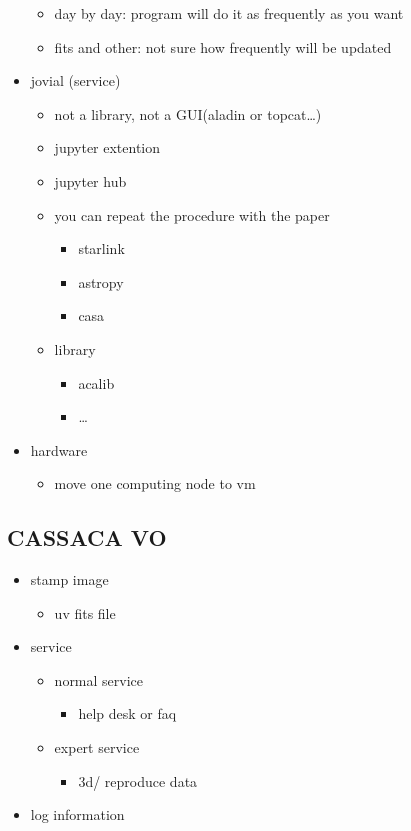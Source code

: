\documentclass[11pt]{article}
\begin{document}
\begin{itemize}
\begin{itemize}
\item day by day: program will do it as frequently as  you want
\item fits and other: not sure how frequently will be updated
\end{itemize}
\item jovial (service)
\begin{itemize}
\item not a library, not a GUI(aladin or topcat\ldots{})
\item jupyter extention
\item jupyter hub
\item you can repeat the procedure with the paper
\begin{itemize}
\item starlink
\item astropy
\item casa
\end{itemize}
\item library
\begin{itemize}
\item acalib
\item \ldots{}
\end{itemize}
\end{itemize}

\item hardware
\begin{itemize}
\item move one computing node to vm
\end{itemize}
\end{itemize}
\subsection{CASSACA VO}
\label{sec-1-5}
\begin{itemize}
\item stamp image
\begin{itemize}
\item uv fits file
\end{itemize}
\item service
\begin{itemize}
\item normal service
\begin{itemize}
\item help desk or faq
\end{itemize}
\item expert service
\begin{itemize}
\item 3d/ reproduce data
\end{itemize}
\end{itemize}
\item log information
\end{itemize}
\end{document}
